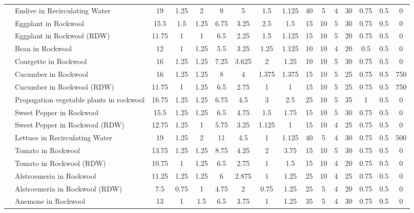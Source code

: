 \documentclass[
  letterpaper,
  DIV=11,
  numbers=noendperiod]{scrreprt}
\begin{document}
\begin{landscape}
\begin{longtable}[t]{llcccccccccccccc}
\endfoot
\bottomrule
\endlastfoot
 & Endive in Recirculating Water & 19 & 1.25 & 2 & 9 & 5 & 1.5 & 1.125 & 40 & 5 & 4 & 30 & 0.75 & 0.5 & 0\\
\nopagebreak
 & Eggplant in Rockwool & 15.5 & 1.5 & 1.25 & 6.75 & 3.25 & 2.5 & 1.5 & 15 & 10 & 5 & 30 & 0.75 & 0.5 & 0\\
\nopagebreak
 & Eggplant in Rockwool (RDW) & 11.75 & 1 & 1 & 6.5 & 2.25 & 1.5 & 1.125 & 15 & 10 & 5 & 20 & 0.75 & 0.5 & 0\\
\nopagebreak
 & Bean in Rockwool & 12 & 1 & 1.25 & 5.5 & 3.25 & 1.25 & 1.125 & 10 & 10 & 4 & 20 & 0.5 & 0.5 & 0\\
\nopagebreak
 & Courgette in Rockwool & 16 & 1.25 & 1.25 & 7.25 & 3.625 & 2 & 1.25 & 10 & 10 & 5 & 30 & 0.75 & 0.5 & 0\\
\nopagebreak
 & Cucumber in Rockwool & 16 & 1.25 & 1.25 & 8 & 4 & 1.375 & 1.375 & 15 & 10 & 5 & 25 & 0.75 & 0.5 & 750\\
\nopagebreak
 & Cucumber in Rockwool (RDW) & 11.75 & 1 & 1.25 & 6.5 & 2.75 & 1 & 1 & 15 & 10 & 5 & 25 & 0.75 & 0.5 & 750\\
\nopagebreak
 & Propagation vegetable plants in rockwool & 16.75 & 1.25 & 1.25 & 6.75 & 4.5 & 3 & 2.5 & 25 & 10 & 5 & 35 & 1 & 0.5 & 0\\
\nopagebreak
 & Sweet Pepper in Rockwool & 15.5 & 1.25 & 1.25 & 6.5 & 4.75 & 1.5 & 1.75 & 15 & 10 & 5 & 30 & 0.75 & 0.5 & 0\\
\nopagebreak
 & Sweet Pepper in Rockwool (RDW) & 12.75 & 1.25 & 1 & 5.75 & 3.25 & 1.125 & 1 & 15 & 10 & 4 & 25 & 0.75 & 0.5 & 0\\
\nopagebreak
 & Lettuce in Recirculating Water & 19 & 1.25 & 2 & 11 & 4.5 & 1 & 1.125 & 40 & 5 & 4 & 30 & 0.75 & 0.5 & 500\\
\nopagebreak
 & Tomato in Rockwool & 13.75 & 1.25 & 1.25 & 8.75 & 4.25 & 2 & 3.75 & 15 & 10 & 5 & 30 & 0.75 & 0.5 & 0\\
\nopagebreak
\multirow[t]{-13}{*}{\raggedright\arraybackslash Olericulture} & Tomato in Rockwool (RDW) & 10.75 & 1 & 1.25 & 6.5 & 2.75 & 1 & 1.5 & 15 & 10 & 4 & 20 & 0.75 & 0.5 & 0\\
\cmidrule{1-16}\pagebreak[0]
 & Alstroemeria in Rockwool & 11.25 & 1.25 & 1.25 & 6 & 2.875 & 1 & 1.25 & 25 & 10 & 4 & 25 & 0.75 & 0.5 & 0\\
\nopagebreak
 & Alstroemeria in Rockwool (RDW) & 7.5 & 0.75 & 1 & 4.75 & 2 & 0.75 & 1.25 & 25 & 5 & 4 & 20 & 0.75 & 0.5 & 0\\
\nopagebreak
 & Anemone in Rockwool & 13 & 1 & 1.5 & 6.5 & 3.75 & 1 & 1.25 & 35 & 5 & 4 & 30 & 0.75 & 0.5 & 0\\

\end{longtable}
\end{landscape}
\end{document}
